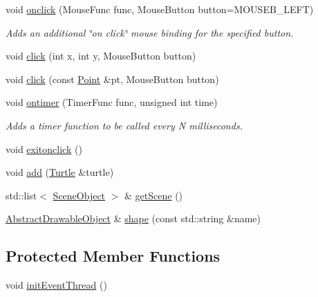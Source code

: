 \begin{DoxyCompactItemize}
void \hyperlink{classcturtle_1_1InteractiveTurtleScreen_a05410a8f835e296f8ffca90ca3b0da24}{onclick} (Mouse\+Func func, Mouse\+Button button=M\+O\+U\+S\+E\+B\+\_\+\+L\+E\+FT)
\begin{DoxyCompactList}\small\item\em Adds an additional \char`\"{}on click\char`\"{} mouse binding for the specified button. \end{DoxyCompactList}\item 
void \hyperlink{classcturtle_1_1InteractiveTurtleScreen_a8fcbf045a17072cc8dda12f20035bb97}{click} (int x, int y, Mouse\+Button button)
\item 
void \hyperlink{classcturtle_1_1InteractiveTurtleScreen_a793b9bc88ac4ce7c5b6d8b6fbc96a3fe}{click} (const \hyperlink{structcturtle_1_1ivec2}{Point} \&pt, Mouse\+Button button)
\item 
void \hyperlink{classcturtle_1_1InteractiveTurtleScreen_ab60ddd682f7fa7df3635f936bcfd2f70}{ontimer} (Timer\+Func func, unsigned int time)
\begin{DoxyCompactList}\small\item\em Adds a timer function to be called every N milliseconds. \end{DoxyCompactList}\item 
void \hyperlink{classcturtle_1_1InteractiveTurtleScreen_ada27fc4b13ce99e45531ccf703d1fb8a}{exitonclick} ()
\item 
void \hyperlink{classcturtle_1_1InteractiveTurtleScreen_ab9696275e4a7b10225cfe10e48fd8c89}{add} (\hyperlink{classcturtle_1_1Turtle}{Turtle} \&turtle)
\item 
std\+::list$<$ \hyperlink{structcturtle_1_1SceneObject}{Scene\+Object} $>$ \& \hyperlink{classcturtle_1_1InteractiveTurtleScreen_aa1bd826458a718e7605424d5767f79c9}{get\+Scene} ()
\item 
\hyperlink{classcturtle_1_1AbstractDrawableObject}{Abstract\+Drawable\+Object} \& \hyperlink{classcturtle_1_1InteractiveTurtleScreen_ae855fb3d2acd831ce751e9387b8edc06}{shape} (const std\+::string \&name)
\end{DoxyCompactItemize}
\subsection*{Protected Member Functions}
\begin{DoxyCompactItemize}
\item 
void \hyperlink{classcturtle_1_1InteractiveTurtleScreen_aa7c436f89d052e42500356ee5f479776}{init\+Event\+Thread} ()
\end{DoxyCompactItemize}

